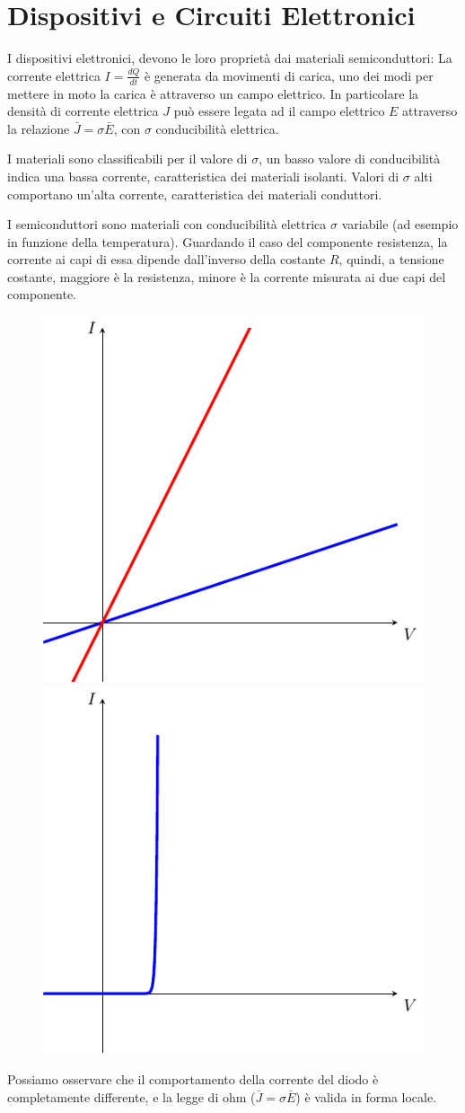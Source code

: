 \documentclass[../template]{subfiles}
\begin{document}
\section{Dispositivi e Circuiti Elettronici}
I dispositivi elettronici, devono le loro proprietà dai materiali semiconduttori:
La corrente elettrica $I = \frac{dQ}{dt}$ è generata da movimenti di carica, uno dei modi per mettere in moto la carica è attraverso un campo elettrico.
In particolare la densità di corrente elettrica $J$ può essere legata ad il campo elettrico $E$ attraverso la relazione $\bar{J} = \sigma \bar{E}$, con $\sigma$ conducibilità elettrica.

I materiali sono classificabili per il valore di $\sigma$, un basso valore di conducibilità indica una bassa corrente, caratteristica dei materiali isolanti.
Valori di $\sigma$ alti comportano un'alta corrente, caratteristica dei materiali conduttori.

I semiconduttori sono materiali con conducibilità elettrica $\sigma$ variabile (ad esempio in funzione della temperatura).
Guardando il caso del componente resistenza, la corrente ai capi di essa dipende dall'inverso della costante $R$, quindi, a tensione costante, maggiore è la resistenza, minore è la corrente misurata ai due capi del componente.

\begin{figure}[h]
    \centering
    \includegraphics[width=.30\textwidth]{img/resistence-current}
    \includegraphics[width=.30\textwidth]{img/diode-current-graph}
\end{figure}

Possiamo osservare che il comportamento della corrente del diodo è completamente differente, e la legge di ohm ($\bar{J} = \sigma \bar{E}$) è valida in forma locale.
\end{document}
